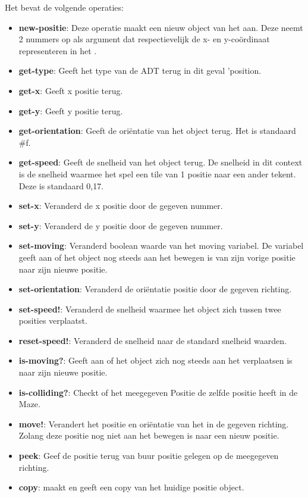 Het \texttt{} bevat de volgende operaties:

\begin{itemize}
	\item \textbf{new-positie}: Deze operatie maakt een nieuw object van het \texttt{} aan. 
		Deze neemt 2 nummers op als argument
		dat respectievelijk de x- en y-co\"ordinaat representeren in het \texttt{}.
	\item \textbf{get-type}: Geeft het type van de ADT terug in dit geval 'position.
	\item \textbf{get-x}: Geeft x positie terug.
	\item \textbf{get-y}: Geeft y positie terug.
	\item \textbf{get-orientation}: Geeft de oriëntatie van het object terug.
		Het is standaard \#f.
	\item \textbf{get-speed}: Geeft de snelheid van het object terug.
		De snelheid in dit context is 
		de snelheid waarmee het spel een tile van 1 positie naar een ander tekent.
		Deze is standaard 0,17.
	\item \textbf{set-x}: Veranderd de x positie door de gegeven nummer.
	\item \textbf{set-y}: Veranderd de y positie door de gegeven nummer.
	\item \textbf{set-moving}: Veranderd boolean waarde van het moving variabel.
		De variabel geeft aan of het object nog steeds aan het bewegen is van zijn vorige positie naar zijn nieuwe positie.
	\item \textbf{set-orientation}: Veranderd de oriëntatie positie door de gegeven richting.
	\item \textbf{set-speed!}: Veranderd de snelheid waarmee het object zich tussen twee posities verplaatst.
	\item \textbf{reset-speed!}: Veranderd de snelheid naar de standard snelheid waarden.
	\item \textbf{is-moving?}: Geeft aan of het object zich nog steeds aan het verplaatsen is naar zijn nieuwe positie.
	\item \textbf{is-colliding?}: Checkt of het meegegeven Positie de zelfde positie heeft in de Maze.
	\item \textbf{move!}: Verandert het positie en oriëntatie van het \texttt{} in de gegeven richting.
		Zolang deze positie nog niet aan het bewegen is naar een nieuw positie.
	\item \textbf{peek}: Geef de positie terug van buur positie gelegen op de meegegeven richting.
	\item \textbf{copy}: maakt en geeft een copy van het huidige positie object.
\end{itemize}

